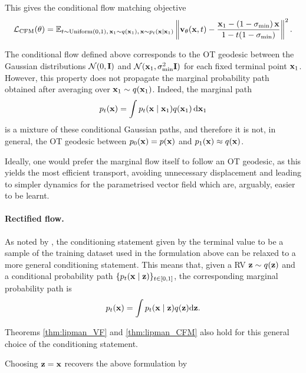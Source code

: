 This gives the conditional flow matching objective
\begin{equation}
\label{eq:CFM_loss_final}
{\mathcal L}_\text{CFM}(\theta)
=
\mathbb{E}_{t\sim\text{Uniform}\left(0,1\right),\,{ \mathbf{x}}_1\sim q({ \mathbf{x}}_1),\,{ \mathbf{x}}\sim p_t({ \mathbf{x}} \mid { \mathbf{x}}_1)}
\left\|
{ \mathbf{v}}_\theta({ \mathbf{x}},t)
-
\frac{{ \mathbf{x}}_1 - (1-\sigma_{\min})\,{ \mathbf{x}}}
     {1 - t(1-\sigma_{\min})}
\right\|^2 .
\end{equation}

\begin{remark}
The conditional flow defined above corresponds to the OT geodesic between the Gaussian distributions 
${\mathcal N}(0,{\mathbf I})$ and ${\mathcal N}({ \mathbf{x}}_1,\sigma_{\min}^2{\mathbf I})$ for each fixed terminal point ${ \mathbf{x}}_1$. 
However, this property does not propagate the marginal probability path obtained after averaging over ${ \mathbf{x}}_1 \sim q({ \mathbf{x}}_1)$. 
Indeed, the marginal path 
\[
p_t({ \mathbf{x}}) = \int p_t({ \mathbf{x}} \mid { \mathbf{x}}_1) q({ \mathbf{x}}_1)\,{\text{d}} { \mathbf{x}}_1
\]
is a mixture of these conditional Gaussian paths, and therefore it is not, in general, the OT geodesic between $p_0({ \mathbf{x}})=p({ \mathbf{x}})$ and $p_1({ \mathbf{x}})\approx q({ \mathbf{x}})$.

Ideally, one would prefer the marginal flow itself to follow an OT geodesic, as this yields the most efficient transport, avoiding unnecessary displacement and leading to simpler dynamics for the parametrised vector field which are, arguably, easier to be learnt.
\end{remark}



\paragraph{Rectified flow.} As noted by \cite{tong2024improving}, the conditioning statement given by the terminal value to be a sample of the training dataset used in the formulation above can be relaxed to a more general conditioning statement. This means that, given a RV ${ \mathbf{z}}\sim q({ \mathbf{z}})$ and a conditional probability path $\{p_t({ \mathbf{x}} \mid { \mathbf{z}})\}_{t\in[0,1]}$, the corresponding marginal probability path is 
\begin{equation}
    p_t({ \mathbf{x}}) = \int p_t({ \mathbf{x}} \mid { \mathbf{z}}) q({ \mathbf{z}}) {\text{d}}{ \mathbf{z}}.
\end{equation}
\begin{remark}
    Theorems \ref{thm:lipman_VF} and  \ref{thm:lipman_CFM} also hold for this general choice of the conditioning statement. 
\end{remark}
\begin{remark}
    Choosing ${ \mathbf{z}}={ \mathbf{x}}$ recovers the above formulation by \cite{lipman2023flowmatching}
\end{remark}

